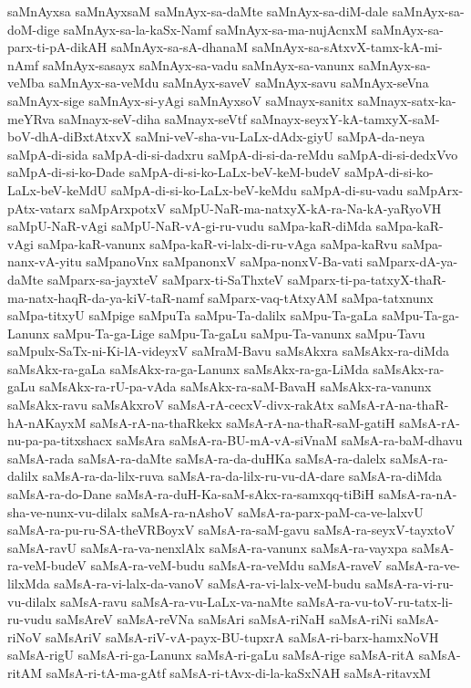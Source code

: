 {saMnAyxsa
saMnAyxsaM
saMnAyx-sa-daMte
saMnAyx-sa-diM-dale
saMnAyx-sa-doM-dige
saMnAyx-sa-la-kaSx-Namf
saMnAyx-sa-ma-nujAcnxM
saMnAyx-sa-parx-ti-pA-dikAH
saMnAyx-sa-sA-dhanaM
saMnAyx-sa-sAtxvX-tamx-kA-mi-nAmf
saMnAyx-sasayx
saMnAyx-sa-vadu
saMnAyx-sa-vanunx
saMnAyx-sa-veMba
saMnAyx-sa-veMdu
saMnAyx-saveV
saMnAyx-savu
saMnAyx-seVna
saMnAyx-sige
saMnAyx-si-yAgi
saMnAyxsoV
saMnayx-sanitx
saMnayx-satx-ka-meYRva
saMnayx-seV-diha
saMnayx-seVtf
saMnayx-seyxY-kA-tamxyX-saM-boV-dhA-diBxtAtxvX
saMni-veV-sha-vu-LaLx-dAdx-giyU
saMpA-da-neya
saMpA-di-sida
saMpA-di-si-dadxru
saMpA-di-si-da-reMdu
saMpA-di-si-dedxVvo
saMpA-di-si-ko-Dade
saMpA-di-si-ko-LaLx-beV-keM-budeV
saMpA-di-si-ko-LaLx-beV-keMdU
saMpA-di-si-ko-LaLx-beV-keMdu
saMpA-di-su-vadu
saMpArx-pAtx-vatarx
saMpArxpotxV
saMpU-NaR-ma-natxyX-kA-ra-Na-kA-yaRyoVH
saMpU-NaR-vAgi
saMpU-NaR-vA-gi-ru-vudu
saMpa-kaR-diMda
saMpa-kaR-vAgi
saMpa-kaR-vanunx
saMpa-kaR-vi-lalx-di-ru-vAga
saMpa-kaRvu
saMpa-nanx-vA-yitu
saMpanoVnx
saMpanonxV
saMpa-nonxV-Ba-vati
saMparx-dA-ya-daMte
saMparx-sa-jayxteV
saMparx-ti-SaThxteV
saMparx-ti-pa-tatxyX-thaR-ma-natx-haqR-da-ya-kiV-taR-namf
saMparx-vaq-tAtxyAM
saMpa-tatxnunx
saMpa-titxyU
saMpige
saMpuTa
saMpu-Ta-dalilx
saMpu-Ta-gaLa
saMpu-Ta-ga-Lanunx
saMpu-Ta-ga-Lige
saMpu-Ta-gaLu
saMpu-Ta-vanunx
saMpu-Tavu
saMpulx-SaTx-ni-Ki-lA-videyxV
saMraM-Bavu
saMsAkxra
saMsAkx-ra-diMda
saMsAkx-ra-gaLa
saMsAkx-ra-ga-Lanunx
saMsAkx-ra-ga-LiMda
saMsAkx-ra-gaLu
saMsAkx-ra-rU-pa-vAda
saMsAkx-ra-saM-BavaH
saMsAkx-ra-vanunx
saMsAkx-ravu
saMsAkxroV
saMsA-rA-cecxV-divx-rakAtx
saMsA-rA-na-thaR-hA-nAKayxM
saMsA-rA-na-thaRkekx
saMsA-rA-na-thaR-saM-gatiH
saMsA-rA-nu-pa-pa-titxshacx
saMsAra
saMsA-ra-BU-mA-vA-siVnaM
saMsA-ra-baM-dhavu
saMsA-rada
saMsA-ra-daMte
saMsA-ra-da-duHKa
saMsA-ra-dalelx
saMsA-ra-dalilx
saMsA-ra-da-lilx-ruva
saMsA-ra-da-lilx-ru-vu-dA-dare
saMsA-ra-diMda
saMsA-ra-do-Dane
saMsA-ra-duH-Ka-saM-sAkx-ra-samxqq-tiBiH
saMsA-ra-nA-sha-ve-nunx-vu-dilalx
saMsA-ra-nAshoV
saMsA-ra-parx-paM-ca-ve-lalxvU
saMsA-ra-pu-ru-SA-theVRBoyxV
saMsA-ra-saM-gavu
saMsA-ra-seyxV-tayxtoV
saMsA-ravU
saMsA-ra-va-nenxlAlx
saMsA-ra-vanunx
saMsA-ra-vayxpa
saMsA-ra-veM-budeV
saMsA-ra-veM-budu
saMsA-ra-veMdu
saMsA-raveV
saMsA-ra-ve-lilxMda
saMsA-ra-vi-lalx-da-vanoV
saMsA-ra-vi-lalx-veM-budu
saMsA-ra-vi-ru-vu-dilalx
saMsA-ravu
saMsA-ra-vu-LaLx-va-naMte
saMsA-ra-vu-toV-ru-tatx-li-ru-vudu
saMsAreV
saMsA-reVNa
saMsAri
saMsA-riNaH
saMsA-riNi
saMsA-riNoV
saMsAriV
saMsA-riV-vA-payx-BU-tupxrA
saMsA-ri-barx-hamxNoVH
saMsA-rigU
saMsA-ri-ga-Lanunx
saMsA-ri-gaLu
saMsA-rige
saMsA-ritA
saMsA-ritAM
saMsA-ri-tA-ma-gAtf
saMsA-ri-tAvx-di-la-kaSxNAH
saMsA-ritavxM
}
